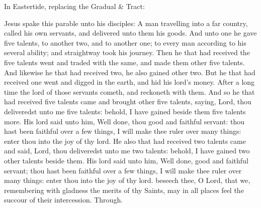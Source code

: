 
\begin{rubric}
{In Eastertide, replacing the Gradual \& Tract:}
\end{rubric}\par\noindent


 Jesus spake this parable unto his disciples: A man travelling into a far country, called his own servants, and delivered unto them his goods. And unto one he gave five talents, to another two, and to another one; to every man according to his several ability; and straightway took his journey. Then he that had received the five talents went and traded with the same, and made them other five talents. And likewise he that had received two, he also gained other two. But he that had received one went and digged in the earth, and hid his lord's money. After a long time the lord of those servants cometh, and reckoneth with them. And so he that had received five talents came and brought other five talents, saying, Lord, thou deliveredst unto me five talents: behold, I have gained beside them five talents more. His lord said unto him, Well done, thou good and faithful servant: thou hast been faithful over a few things, I will make thee ruler over many things: enter thou into the joy of thy lord. He also that had received two talents came and said, Lord, thou deliveredst unto me two talents: behold, I have gained two other talents beside them. His lord said unto him, Well done, good and faithful servant; thou hast been faithful over a few things, I will make thee ruler over many things: enter thou into the joy of thy lord.
\secret
{} beseech thee, O Lord, that we, remembering with gladness the merits of thy Saints, may in all places feel the succour of their intercession. Through.


